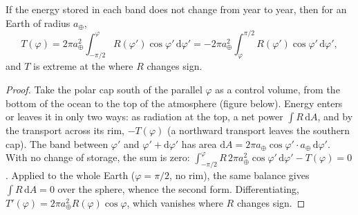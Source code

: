 \begin{proposition}\label{prop:b1:radiation-heat-transport:mht}
If the energy stored in each  band does not change from year to year, then
for an Earth of radius $a_\oplus$,
\[
  T(\varphi) = 2\pi a_\oplus^2\int_{-\pi/2}^{\varphi} R(\varphi')\cos\varphi'\,
  \mathrm d\varphi' = -2\pi a_\oplus^2\int_{\varphi}^{\pi/2} R(\varphi')\cos
  \varphi'\,\mathrm d\varphi' ,
\]
and $T$ is extreme at the  where $R$ changes sign.
\end{proposition}

\begin{proof}
Take the polar cap south of the parallel $\varphi$ as a control volume, from the
bottom of the ocean to the top of the atmosphere (figure below). Energy enters or
leaves it in only two ways: as radiation at the top, a net power
$\int R\,\mathrm dA$, and by the transport across its rim, $-T(\varphi)$ (a
northward transport leaves the southern cap). The band between $\varphi'$ and
$\varphi' + \mathrm d\varphi'$ has area $\mathrm dA = 2\pi a_\oplus\cos\varphi'
\cdot a_\oplus\,\mathrm d\varphi'$. With no change of storage, the sum is zero:
$\int_{-\pi/2}^{\varphi} R\,2\pi a_\oplus^2\cos\varphi'\,\mathrm d\varphi' -
T(\varphi) = 0$. Applied to the whole Earth ($\varphi = \pi/2$, no rim), the same
balance gives $\int R\,\mathrm dA = 0$ over the sphere, whence the second form.
Differentiating, $T'(\varphi) = 2\pi a_\oplus^2 R(\varphi)\cos\varphi$, which
vanishes where $R$ changes sign.
\end{proof}

